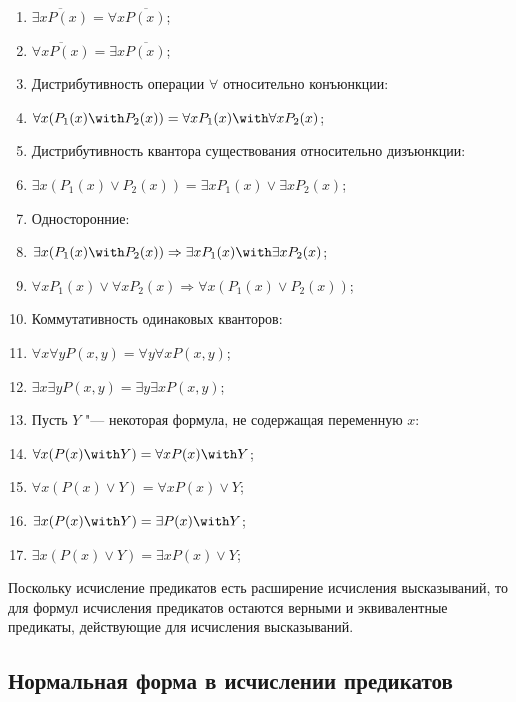 \begin{enumerate}
\item $\overline{\exists x P(x)} = \forall x \overline{P(x)}$;
\item $\overline{\forall x P(x)} = \exists x \overline{P(x)}$;

\item[] Дистрибутивность операции $\forall$ относительно конъюнкции:
\item $\forall x (P_1(x) \with P_2(x)) = \forall x P_1(x) \with
\forall x P_2(x)$;

\item[] Дистрибутивность квантора существования относительно
дизъюнкции:
\item $\exists x (P_1(x) \lor P_2(x)) = \exists x P_1(x) \lor \exists
x P_2(x)$;

\item[] Односторонние:
\item $\exists x (P_1(x) \with P_2(x)) \Rightarrow \exists x P_1(x)
\with \exists x P_2(x)$;
\item $\forall x P_1(x) \lor \forall x P_2(x) \Rightarrow \forall x
(P_1(x) \lor P_2(x))$;

\item[] Коммутативность одинаковых кванторов:
\item $\forall x \forall y P(x,y) = \forall y \forall x P(x,y)$;
\item $\exists x \exists y P(x,y) = \exists y \exists x P(x,y)$;

\item[] Пусть $Y$ "--- некоторая формула, не содержащая переменную $x$:
\item $\forall x (P(x) \with Y) = \forall x P(x) \with Y$;
\item $\forall x (P(x) \lor Y) = \forall x P(x) \lor Y$;
\item $\exists x (P(x) \with Y) = \exists P(x) \with Y$;
\item $\exists x (P(x) \lor Y) = \exists x P(x) \lor Y$;
\end{enumerate}

\begin{rem} Поскольку исчисление предикатов есть расширение исчисления
высказываний, то для формул исчисления предикатов остаются верными и
эквивалентные предикаты, действующие для исчисления высказываний.
\end{rem}

\subsection{Нормальная форма в исчислении предикатов}


